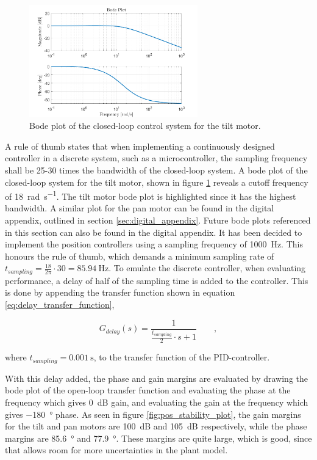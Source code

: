 \documentclass[../../main.tex]{subfiles}
\begin{document}
\begin{figure}[h]
    \centering
    \includegraphics[width=0.65\textwidth]{Sections/System_Design/Images/Bode_TiltMotorPos.png}
    \caption{Bode plot of the closed-loop control system for the tilt motor.}
    \label{fig:pos_bode_plot}
\end{figure}

A rule of thumb states that when implementing a continuously designed controller in a discrete system, such as a microcontroller, the sampling frequency shall be 25-30 times the bandwidth of the closed-loop system. A bode plot of the closed-loop system for the tilt motor, shown in figure \ref{fig:pos_bode_plot} reveals a cutoff frequency of \SI{18}{\radian \per \second}. The tilt motor bode plot is highlighted since it has the highest bandwidth. A similar plot for the pan motor can be found in the digital appendix, outlined in section \ref{sec:digital_appendix}. Future bode plots referenced in this section can also be found in the digital appendix. It has been decided to implement the position controllers using a sampling frequency of \SI{1000}{\hertz}. This honours the rule of thumb, which demands a minimum sampling rate of $t_{sampling} = \frac{18}{2\pi}\cdot 30 = \SI{85.94}{\hertz}$.
To emulate the discrete controller, when evaluating performance, a delay of half of the sampling time is added to the controller. This is done by appending the transfer function shown in equation \ref{eq:delay_transfer_function},

\begin{equation}\label{eq:delay_transfer_function}
    G_{delay}(s) = \frac{1}{\frac{t_{sampling}}{2}\cdot s+1} \qquad ,
\end{equation}

where $t_{sampling} = \SI{0.001}{\second}$, to the transfer function of the PID-controller. 

With this delay added, the phase and gain margins are evaluated by drawing the bode plot of the open-loop transfer function and evaluating the phase at the frequency which gives  \SI{0}{\deci \bel} gain, and evaluating the gain at the frequency which gives \SI{-180}{\degree} phase. As seen in figure \ref{fig:pos_stability_plot}, the gain margins for the tilt and pan motors are \SI{100}{\deci \bel} and \SI{105}{\deci \bel} respectively, while the phase margins are \SI{85.6}{\degree} and \SI{77.9}{\degree}. These margins are quite large, which is good, since that allows room for more uncertainties in the plant model.
\end{document}
